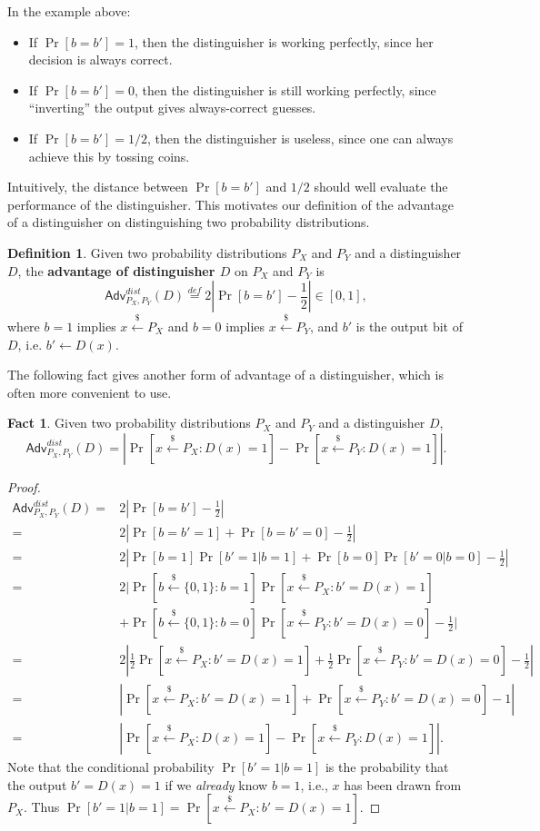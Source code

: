 \documentclass[12pt]{article}
\newcommand{\eqdef}{\stackrel{def}{=}}
\newcommand{\bits}{\{0,1\}}
\newcommand{\getsr}{\stackrel{\$}{\gets}}
\newcommand{\Adv}{\textsf{Adv}}
\theoremstyle{definition}
\newtheorem{definition}[theorem]{Definition}
\newtheorem{fact}[theorem]{Fact}
\begin{document}
In the example above: 
\begin{itemize}
\item If $\Pr[b=b'] = 1$, then the distinguisher is working perfectly, since her decision is always correct.
\item If $\Pr[b=b'] = 0$, then the distinguisher is still working perfectly, since ``inverting'' the output gives always-correct guesses.
\item If $\Pr[b=b'] = 1/2$, then the distinguisher is useless, since one can always achieve this by tossing coins.   
\end{itemize}

Intuitively, the distance between $\Pr[b=b']$ and $1/2$ should well evaluate the performance of the distinguisher. This motivates our definition of the advantage of a distinguisher on distinguishing two probability distributions.
\begin{definition}
Given two probability distributions $P_X$ and $P_Y$ and a distinguisher $D$, the {\bf advantage of distinguisher $D$} on $P_X$ and $P_Y$ is
$$\Adv_{P_X,P_Y}^{dist}(D) \eqdef 2\left|\Pr[b=b'] - \frac{1}{2} \right| \in [0,1],$$
where $b=1$ implies $x\getsr P_X$ and $b=0$ implies $x\getsr P_Y$, and $b'$ is the output bit of $D$, i.e. $b' \gets D(x)$.
\end{definition}

The following fact gives another form of advantage of a distinguisher, which is often more convenient to use.
\begin{fact}
\label{fact}
Given two probability distributions $P_X$ and $P_Y$ and a distinguisher $D$,
$$\Adv_{P_X,P_Y}^{dist}(D) = \left| \Pr[x\getsr P_X: D(x)=1] - \Pr[x\getsr P_Y: D(x)=1] \right|.$$
\end{fact}
\begin{proof}
\[
\begin{aligned}
\Adv_{P_X,P_Y}^{dist}(D) =& 2\left|\Pr[b=b'] - \frac{1}{2} \right| \\
=& 2\left|\Pr[b=b'=1] + \Pr[b=b'=0] - \frac{1}{2} \right| \\
=& 2\left|\Pr[b=1]\Pr[b'=1|b=1] + \Pr[b=0]\Pr[b'=0|b=0] - \frac{1}{2} \right| \\
=& 2\bigg|\Pr[b\getsr \bits: b=1]\Pr[x\getsr P_X: b'=D(x)=1] \\
	&+ \Pr[b\getsr \bits: b=0]\Pr[x\getsr P_Y: b'=D(x)=0] - \frac{1}{2} \bigg| \\
=& 2\left|\frac{1}{2}\Pr[x\getsr P_X: b'=D(x)=1] + \frac{1}{2}\Pr[x\getsr P_Y: b'=D(x)=0] - \frac{1}{2} \right| \\
=& \left|\Pr[x\getsr P_X: b'=D(x)=1] + \Pr[x\getsr P_Y: b'=D(x)=0] - 1 \right| \\
=& \left|\Pr[x\getsr P_X: D(x)=1] - \Pr[x\getsr P_Y: D(x)=1] \right|.
\end{aligned}
\]
Note that the conditional probability $\Pr[b'=1|b=1]$ is the probability that the output $b'=D(x)=1$ if we \emph{already} know $b=1$, i.e., $x$ has been drawn from $P_X$. Thus $\Pr[b'=1|b=1] = \Pr[x\getsr P_X: b'=D(x)=1]$.
\end{proof}
\end{document}
